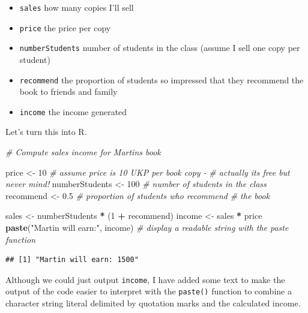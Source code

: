 \documentclass[
]{article}
\newenvironment{Shaded}{\begin{snugshade}}{\end{snugshade}}
\newcommand{\CommentTok}[1]{\textcolor[rgb]{0.56,0.35,0.01}{\textit{#1}}}
\newcommand{\DecValTok}[1]{\textcolor[rgb]{0.00,0.00,0.81}{#1}}
\newcommand{\FloatTok}[1]{\textcolor[rgb]{0.00,0.00,0.81}{#1}}
\newcommand{\FunctionTok}[1]{\textcolor[rgb]{0.13,0.29,0.53}{\textbf{#1}}}
\newcommand{\NormalTok}[1]{#1}
\newcommand{\OtherTok}[1]{\textcolor[rgb]{0.56,0.35,0.01}{#1}}
\newcommand{\SpecialCharTok}[1]{\textcolor[rgb]{0.81,0.36,0.00}{\textbf{#1}}}
\newcommand{\StringTok}[1]{\textcolor[rgb]{0.31,0.60,0.02}{#1}}
\providecommand{\tightlist}{%
  \setlength{\itemsep}{0pt}\setlength{\parskip}{0pt}}
\begin{document}
\begin{itemize}
\tightlist
\item
  \texttt{sales} how many copies I'll sell\\
\item
  \texttt{price} the price per copy
\item
  \texttt{numberStudents} number of students in the class (assume I sell
  one copy per student)
\item
  \texttt{recommend} the proportion of students so impressed that they
  recommend the book to friends and family
\item
  \texttt{income} the income generated
\end{itemize}

Let's turn this into R.

\begin{Shaded}
\begin{Highlighting}[]
\CommentTok{\# Compute sales income for Martin\textquotesingle{}s book}

\NormalTok{price }\OtherTok{\textless{}{-}} \DecValTok{10}                                 \CommentTok{\# assume price is 10 UKP per book copy {-}}
                                            \CommentTok{\# actually it\textquotesingle{}s free but never mind!}
\NormalTok{numberStudents }\OtherTok{\textless{}{-}} \DecValTok{100}                       \CommentTok{\# number of students in the class}
\NormalTok{recommend }\OtherTok{\textless{}{-}} \FloatTok{0.5}                            \CommentTok{\# proportion of students who recommend }
                                            \CommentTok{\# the book}

\NormalTok{sales }\OtherTok{\textless{}{-}}\NormalTok{ numberStudents }\SpecialCharTok{*}\NormalTok{ (}\DecValTok{1} \SpecialCharTok{+}\NormalTok{ recommend)}
\NormalTok{income }\OtherTok{\textless{}{-}}\NormalTok{ sales }\SpecialCharTok{*}\NormalTok{ price}
\FunctionTok{paste}\NormalTok{(}\StringTok{"Martin will earn:"}\NormalTok{, income)          }\CommentTok{\# display a readable string with the paste function}
\end{Highlighting}
\end{Shaded}

\begin{verbatim}
## [1] "Martin will earn: 1500"
\end{verbatim}

Although we could just output \texttt{income}, I have added some text to
make the output of the code easier to interpret with the
\texttt{paste()} function to combine a character string literal
delimited by quotation marks and the calculated income.
\end{document}
